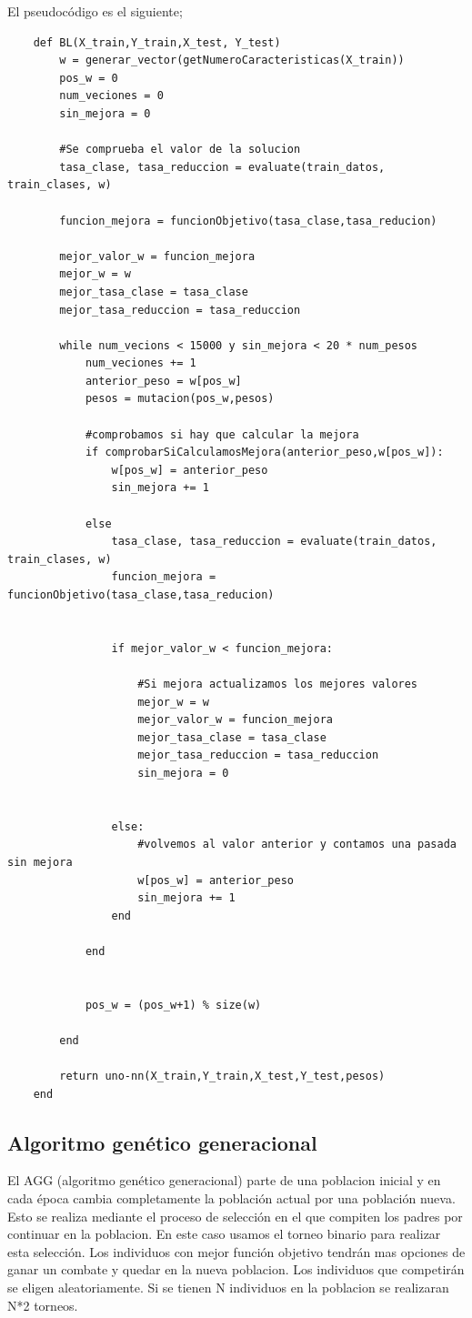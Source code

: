 \documentclass[titlepage]{article}
\begin{document}
	El pseudocódigo es el siguiente;
	\newpage
	\begin{lstlisting}
	def BL(X_train,Y_train,X_test, Y_test)
		w = generar_vector(getNumeroCaracteristicas(X_train))
		pos_w = 0
		num_veciones = 0
		sin_mejora = 0
		
		#Se comprueba el valor de la solucion
		tasa_clase, tasa_reduccion = evaluate(train_datos, train_clases, w)
		
		funcion_mejora = funcionObjetivo(tasa_clase,tasa_reducion)
		
		mejor_valor_w = funcion_mejora
		mejor_w = w
		mejor_tasa_clase = tasa_clase
		mejor_tasa_reduccion = tasa_reduccion
		
		while num_vecions < 15000 y sin_mejora < 20 * num_pesos
			num_veciones += 1
			anterior_peso = w[pos_w]
			pesos = mutacion(pos_w,pesos)
			
			#comprobamos si hay que calcular la mejora
			if comprobarSiCalculamosMejora(anterior_peso,w[pos_w]):
				w[pos_w] = anterior_peso
				sin_mejora += 1	
				
			else
				tasa_clase, tasa_reduccion = evaluate(train_datos, train_clases, w)            
				funcion_mejora = funcionObjetivo(tasa_clase,tasa_reducion)
				
				
				if mejor_valor_w < funcion_mejora:
					
					#Si mejora actualizamos los mejores valores
					mejor_w = w
					mejor_valor_w = funcion_mejora
					mejor_tasa_clase = tasa_clase
					mejor_tasa_reduccion = tasa_reduccion
					sin_mejora = 0
				
				
				else:
					#volvemos al valor anterior y contamos una pasada sin mejora
					w[pos_w] = anterior_peso
					sin_mejora += 1
				end
			
			end
			
			
			pos_w = (pos_w+1) % size(w)
		
		end
		
		return uno-nn(X_train,Y_train,X_test,Y_test,pesos)
	end
	\end{lstlisting}
	\subsection{Algoritmo genético generacional}
	El AGG (algoritmo genético generacional) parte de una poblacion inicial y en cada época cambia completamente la población actual por una población nueva. Esto se realiza mediante el proceso de selección en el que compiten los padres por continuar en la poblacion. En este caso usamos el torneo binario para realizar esta selección. Los individuos con mejor función objetivo tendrán mas opciones de ganar un combate y quedar en la nueva poblacion. Los individuos que competirán se eligen aleatoriamente. Si se tienen N individuos en la poblacion se realizaran N*2 torneos. 
	
\end{document}
